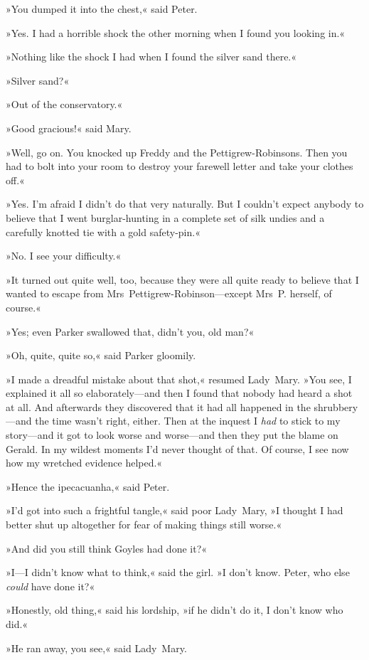 »You dumped it into the chest,« said Peter.

»Yes. I had a horrible shock the other morning when I found you looking in.«

»Nothing like the shock I had when I found the silver sand there.«

»Silver sand?«

»Out of the conservatory.«

»Good gracious!« said Mary.

»Well, go on. You knocked up Freddy and the Pettigrew-Robinsons. Then you had to bolt into your room to destroy your farewell letter and take your clothes off.«

»Yes. I'm afraid I didn't do that very naturally. But I couldn't expect anybody to believe that I went burglar-hunting in a complete set of silk undies and a carefully knotted tie with a gold safety-pin.«

»No. I see your difficulty.«

»It turned out quite well, too, because they were all quite ready to believe that I wanted to escape from Mrs~Pettigrew-Robinson—except Mrs~P\@. herself, of course.«

»Yes; even Parker swallowed that, didn't you, old man?«

»Oh, quite, quite so,« said Parker gloomily.

»I made a dreadful mistake about that shot,« resumed Lady~Mary. »You see, I explained it all so elaborately—and then I found that nobody had heard a shot at all. And afterwards they discovered that it had all happened in the shrubbery—and the time wasn't right, either. Then at the inquest I \textit{had} to stick to my story—and it got to look worse and worse—and then they put the blame on Gerald. In my wildest moments I'd never thought of that. Of course, I see now how my wretched evidence helped.«

»Hence the ipecacuanha,« said Peter.

»I'd got into such a frightful tangle,« said poor Lady~Mary, »I thought I had better shut up altogether for fear of making things still worse.«

»And did you still think Goyles had done it?«

»I—I didn't know what to think,« said the girl. »I don't know. Peter, who else \textit{could} have done it?«

»Honestly, old thing,« said his lordship, »if he didn't do it, I don't know who did.«

»He ran away, you see,« said Lady~Mary.

